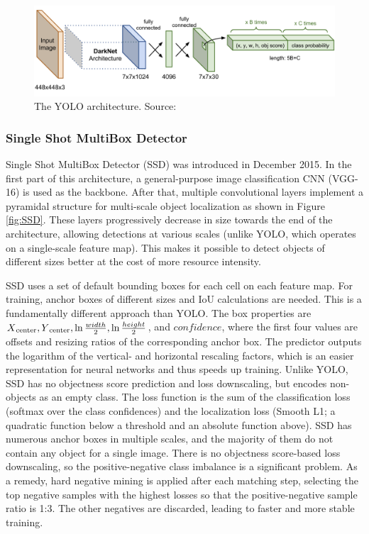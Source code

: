 \begin{figure}[htb]
 \centerline{\includegraphics[width=1.0\columnwidth]{.//Figure/Detector/YOLO.png}}
 \caption{The YOLO architecture. Source: \cite{ObjDetArchitectures4}}
 \label{fig:YOLO}
\end{figure}

\newpage
\subsubsection{Single Shot MultiBox Detector}

Single Shot MultiBox Detector\cite{SSD} (SSD) was introduced in December 2015. In the first part of this architecture, a general-purpose image classification CNN (VGG-16) is used as the backbone. After that, multiple convolutional layers implement a pyramidal structure for multi-scale object localization as shown in Figure \ref{fig:SSD}. These layers progressively decrease in size towards the end of the architecture, allowing detections at various scales (unlike YOLO, which operates on a single-scale feature map). This makes it possible to detect objects of different sizes better at the cost of more resource intensity.

SSD uses a set of default bounding boxes for each cell on each feature map. For training, anchor boxes of different sizes and IoU calculations are needed. This is a fundamentally different approach than YOLO. The box properties are \(X\textsubscript{center}, Y\textsubscript{center}, \ln{\frac{width}{2}}, \ln{\frac{height}{2}}\), and \(confidence\), where the first four values are offsets and resizing ratios of the corresponding anchor box. The predictor outputs the logarithm of the vertical- and horizontal rescaling factors, which is an easier representation for neural networks and thus speeds up training. Unlike YOLO, SSD has no objectness score prediction and loss downscaling, but encodes non-objects as an empty class. The loss function is the sum of the classification loss (softmax over the class confidences) and the localization loss (Smooth L1; a quadratic function below a threshold and an absolute function above). SSD has numerous anchor boxes in multiple scales, and the majority of them do not contain any object for a single image. There is no objectness score-based loss downscaling, so the positive-negative class imbalance is a significant problem. As a remedy, hard negative mining is applied after each matching step, selecting the top negative samples with the highest losses so that the positive-negative sample ratio is 1:3. The other negatives are discarded, leading to faster and more stable training.

